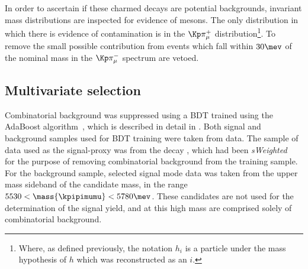 In order to ascertain if these charmed decays are potential backgrounds, invariant mass
distributions are inspected for evidence of \Dz mesons.
The only distribution in which there is evidence of contamination is in the
$\Kp\pi^+_\mu$ distribution\footnote{
  Where, as defined previously, the notation $h_i$ is a particle under the mass hypothesis of $h$
  which was reconstructed as an $i$.
}.
To remove the small possible contribution from \decay{\Bd}{\Dzb\pip\pipi} events which fall within
$30\mev$ of the nominal \Dz mass in the $\Kp\pi^-_\mu$ spectrum are vetoed.





\subsection{Multivariate selection}
\label{sec:hhh:bdt}
Combinatorial background was suppressed using a BDT trained using the AdaBoost
algorithm~\cite{AdaBoost}, which is described in detail in .
Both signal and background samples used for BDT training were taken from data.
The sample of data used as the signal-proxy was from  the decay \btojpsikpipi, which had been
\emph{sWeighted}~\cite{splot} for the purpose of removing combinatorial background from the
training sample.
For the background sample, selected signal mode data was taken from the upper mass sideband of the
\Bp candidate mass, in the range $5530<\mass{\kpipimumu}<5780\mev$.
These candidates are not used for the determination of the signal yield, and at this high mass are
comprised solely of combinatorial background.


